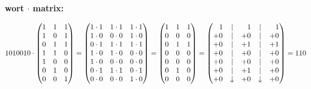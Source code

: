 \textbf{wort $\cdot$ matrix:}

$1010010 \cdot \begin{pmatrix}
1 & 1 & 1\\
1 & 0 & 1\\
0 & 1 & 1\\
1 & 1 & 0\\
1 & 0 & 0\\
0 & 1 & 0\\
0 & 0 & 1
\end{pmatrix} = \begin{pmatrix}
1\cdot1 & 1\cdot1 & 1\cdot1\\
1\cdot0 & 0\cdot0 & 1\cdot0\\
0\cdot1 & 1\cdot1 & 1\cdot1\\
1\cdot0 & 1\cdot0 & 0\cdot0\\
1\cdot0 & 0\cdot0 & 0\cdot0\\
0\cdot1 & 1\cdot1 & 0\cdot1\\
0\cdot0 & 0\cdot0 & 1\cdot0
\end{pmatrix} = \begin{pmatrix}
1 & 1 & 1\\
0 & 0 & 0\\
0 & 1 & 1\\
0 & 0 & 0\\
0 & 0 & 0\\
0 & 1 & 0\\
0 & 0 & 0
\end{pmatrix} = \begin{pmatrix}
\hspace{0.3cm}1 & | & \hspace{0.3cm}1 & | & \hspace{0.3cm}1\\
+0 & | & +0 & | & +0\\
+0 & | & +1 & | & +1\\
+0 & | & +0 & | & +0\\
+0 & | & +0 & | & +0\\
+0 & | & +1 & | & +0\\
+0 & \downarrow & +0 & \downarrow & +0
\end{pmatrix} = 110$\\~\\~\\

